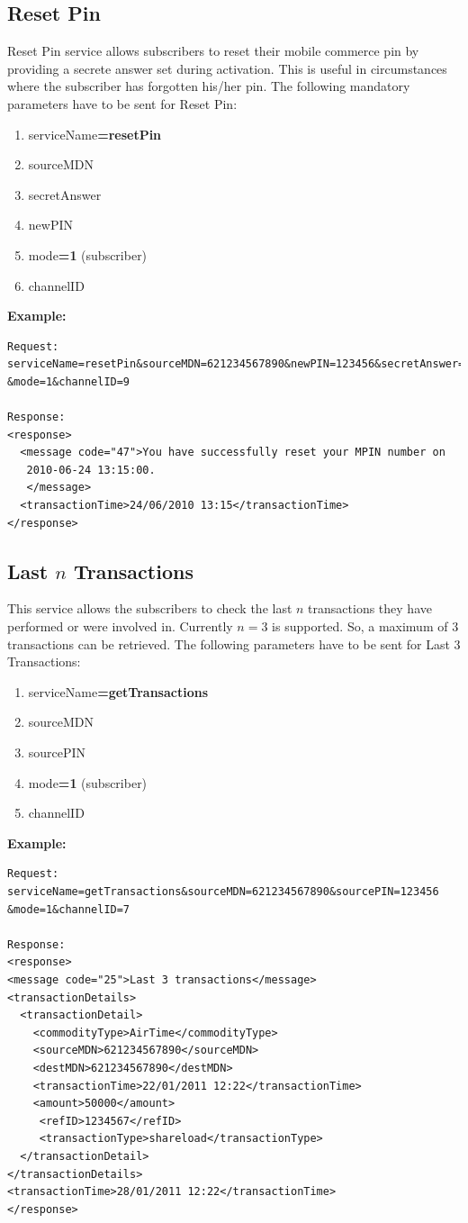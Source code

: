 \documentclass[11pt,titlepage]{article}
\begin{document}
\subsection{Reset Pin}
Reset Pin service allows subscribers to reset their mobile commerce pin by providing a secrete answer set during activation. This is useful in circumstances where the subscriber has forgotten his/her pin.
The following mandatory parameters have to be sent for Reset Pin:
\begin{enumerate}
\item serviceName\textbf{=resetPin}
\item	sourceMDN
\item secretAnswer
\item newPIN
\item mode\textbf{=1} (subscriber)
\item channelID
\end{enumerate}
\textbf{Example:}
\begin{verbatim}
Request:
serviceName=resetPin&sourceMDN=621234567890&newPIN=123456&secretAnswer=12000
&mode=1&channelID=9

Response:
<response>
  <message code="47">You have successfully reset your MPIN number on 
   2010-06-24 13:15:00.
   </message>
  <transactionTime>24/06/2010 13:15</transactionTime>
</response>
\end{verbatim}

\subsection{Last $n$ Transactions}
This service allows the subscribers to check the last $n$ transactions they have performed or were involved in. Currently $n=3$ is supported. So, a maximum of $3$ transactions can be retrieved. 
The following parameters have to be sent for Last 3 Transactions:
\begin{enumerate}
\item serviceName\textbf{=getTransactions}
\item sourceMDN
\item sourcePIN
\item mode\textbf{=1} (subscriber)
\item channelID
\end{enumerate}
\textbf{Example:}
\begin{verbatim}
Request:
serviceName=getTransactions&sourceMDN=621234567890&sourcePIN=123456
&mode=1&channelID=7

Response:
<response>
<message code="25">Last 3 transactions</message>
<transactionDetails>
  <transactionDetail>
    <commodityType>AirTime</commodityType>
    <sourceMDN>621234567890</sourceMDN>
    <destMDN>621234567890</destMDN>
    <transactionTime>22/01/2011 12:22</transactionTime>
    <amount>50000</amount>
	 <refID>1234567</refID>
	 <transactionType>shareload</transactionType>
  </transactionDetail>
</transactionDetails>
<transactionTime>28/01/2011 12:22</transactionTime>
</response>
\end{verbatim}
\end{document}
